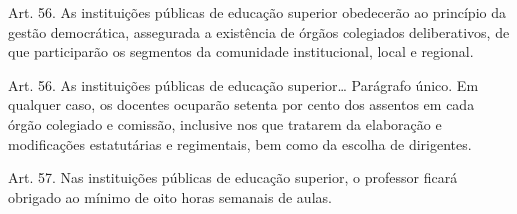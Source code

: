 \documentclass[]{beamer}
\begin{document}
\begin{frame}{}
  Art. 56. As instituições públicas de educação superior obedecerão ao princípio
  da gestão democrática, assegurada a existência de órgãos colegiados
  deliberativos, de que participarão os segmentos da comunidade institucional,
  local e regional.
\end{frame}

\begin{frame}{Art. 56. As instituições públicas de educação superior…}
  Parágrafo único. Em qualquer caso, os docentes ocuparão setenta por cento dos
  assentos em cada órgão colegiado e comissão, inclusive nos que tratarem da
  elaboração e modificações estatutárias e regimentais, bem como da escolha de
  dirigentes.
\end{frame}

\begin{frame}
  Art. 57. Nas instituições públicas de educação superior, o professor ficará
  obrigado ao mínimo de oito horas semanais de aulas.
\end{frame}

\begin{frame}
  \nocite{*}
  
  
\end{frame}
\end{document}
